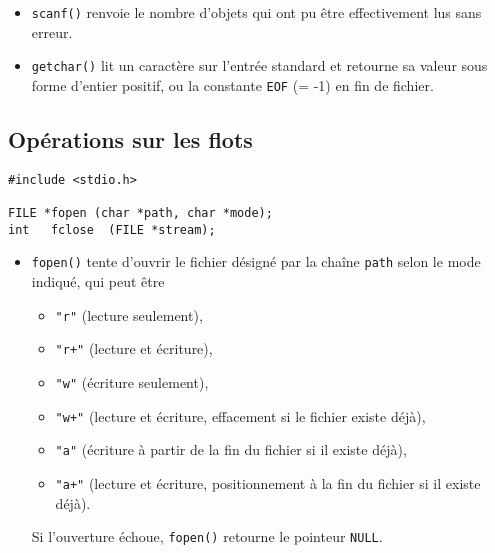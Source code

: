 \begin{itemize}
  \item
\texttt{scanf()} renvoie le nombre d'objets qui ont pu être effectivement
lus sans erreur. 


\item
\texttt{getchar()} lit un caractère sur l'entrée standard et retourne sa 
valeur sous forme d'entier positif, ou la constante \texttt{EOF} (= -1) 
en fin de fichier.
\end{itemize}

\subsection{Opérations sur les flots}



\extrait
\begin{lstlisting}
#include <stdio.h>
  
FILE *fopen (char *path, char *mode);
int   fclose  (FILE *stream);
\end{lstlisting}

\begin{itemize}
  \item 
\texttt{fopen()} tente d'ouvrir le fichier désigné par la chaîne \texttt{path}
selon le mode indiqué, qui peut être 
\begin{itemize}
\item \texttt{"r"} (lecture seulement),
\item \texttt{"r+"} (lecture et écriture),
\item \texttt{"w"} (écriture seulement),
\item \texttt{"w+"} (lecture et écriture, effacement si le fichier existe déjà),
\item \texttt{"a"} (écriture à partir de la fin du fichier si il existe déjà),
\item \texttt{"a+"} (lecture et écriture, positionnement à la fin du fichier
si il existe déjà).
\end{itemize}

Si l'ouverture échoue, \texttt{fopen()} retourne le pointeur \texttt{NULL}.
\end{itemize}

